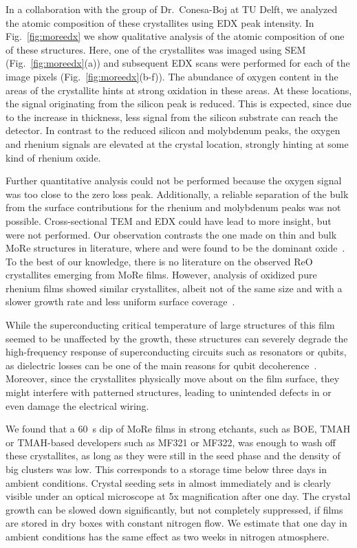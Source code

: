 In a collaboration with the group of Dr.~Conesa-Boj at TU Delft, we analyzed the atomic composition of these crystallites using EDX peak intensity.
In Fig.~\ref{fig:moreedx} we show qualitative analysis of the atomic composition of one of these structures.
%
Here, one of the crystallites was imaged using SEM (Fig.~\ref{fig:moreedx}(a)) and subsequent EDX scans were performed for each of the image pixels (Fig.~\ref{fig:moreedx}(b-f)).
%
The abundance of oxygen content in the areas of the crystallite hints at strong oxidation in these areas.
%
At these locations, the signal originating from the silicon peak is reduced.
%
This is expected, since due to the increase in thickness, less signal from the silicon substrate can reach the detector.
%
In contrast to the reduced silicon and molybdenum peaks, the oxygen and rhenium signals are elevated at the crystal location, strongly hinting at some kind of rhenium oxide.

Further quantitative analysis could not be performed because the oxygen signal was too close to the zero loss peak.
%
Additionally, a reliable separation of the bulk from the surface contributions for the rhenium and molybdenum peaks was not possible.
%
Cross-sectional TEM and EDX could have lead to more insight, but were not performed.
%
Our observation contrasts the one made on thin and bulk MoRe structures in literature, where  and  were found to be the dominant oxide~\cite{seleznevDepositionCharacterizationFewnanometersthick2008b,gotzCosputteredMoReThin2016}.
%
To the best of our knowledge, there is no literature on the observed ReO crystallites emerging from MoRe films.
%
However, analysis of oxidized pure rhenium films showed similar crystallites, albeit not of the same size and with a slower growth rate and less uniform surface coverage~\cite{mannionAmbientAgingRhenium2017,mannionRheniumFilamentOxidation2017}.


While the superconducting critical temperature of large structures of this film seemed to be unaffected by the growth, these structures can severely degrade the high-frequency response of superconducting circuits such as resonators or qubits, as dielectric losses can be one of the main reasons for qubit decoherence~\cite{lisenfeldElectricFieldSpectroscopy2019}.
%
Moreover, since the crystallites physically move about on the film surface, they might interfere with patterned structures, leading to unintended defects in or even damage the electrical wiring.


We found that a \SI{60}{\second} dip of MoRe films in strong etchants, such as BOE, TMAH or TMAH-based developers such as MF321 or MF322, was enough to wash off these crystallites, as long as they were still in the seed phase and the density of big clusters was low.
%
This corresponds to a storage time below three days in ambient conditions.
%
Crystal seeding sets in almost immediately and is clearly visible under an optical microscope at 5x magnification after one day. 
%
The crystal growth can be slowed down significantly, but not completely suppressed, if films are stored in dry boxes with constant nitrogen flow.
%
We estimate that one day in ambient conditions has the same effect as two weeks in nitrogen atmosphere.

